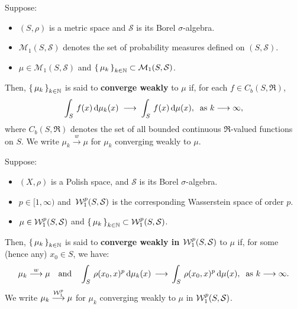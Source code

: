 \begin{definition}
\mbox{}\vskip 0.1cm
\noindent
Suppose:
\begin{itemize}
\item $\left(S,\rho\right)$ is a metric space and $\mathcal{S}$ is its Borel $\sigma$-algebra.
\item $\mathcal{M}_{1}\!\left(S,\mathcal{S}\right)$ denotes the set of probability measures defined on $\left(S,\mathcal{S}\right)$.
\item $\mu \in \mathcal{M}_{1}\!\left(S,\mathcal{S}\right)$ and
	$\left\{\,\mu_{k}\,\right\}_{k\in\mathbb{N}} \subset \mathcal{M}_{1}\!\left(S,\mathcal{S}\right)$.
\end{itemize}
Then, $\left\{\,\mu_{k}\,\right\}_{k\in\mathbb{N}}$ is said to
\textbf{converge weakly} to $\mu$ if, for each $f \in C_{b}(S,\Re)$,
\begin{equation*}
\int_{S}\,f(x)\,\textnormal{d}\mu_{k}(x) \;\longrightarrow\;\int_{S}\,f(x)\,\textnormal{d}\mu(x),
\;\;\textnormal{as $k \longrightarrow \infty$},
\end{equation*}
where $C_{b}(S,\Re)$ denotes the set of all bounded continuous $\Re$-valued functions on $S$.
We write $\mu_{k}\overset{w}{\longrightarrow}\mu$ for $\mu_{k}$ converging weakly to $\mu$.
\end{definition}

\begin{definition}
\label{definition:WassersteinConvergence}
\mbox{}\vskip 0.1cm
\noindent
Suppose:
\begin{itemize}
\item $(X, \rho)$ is a Polish space, and $\mathcal{S}$ is its Borel $\sigma$-algebra.
\item $p \in [1,\infty)$ and\,
	$\mathcal{W}^{p}_{1}\!\left(S,\mathcal{S}\right)$ is the corresponding Wasserstein space of order $p$.
\item $\mu \in \mathcal{W}^{p}_{1}\!\left(S,\mathcal{S}\right)$ and
	$\left\{\,\mu_{k}\,\right\}_{k\in\mathbb{N}} \subset \mathcal{W}^{p}_{1}\!\left(S,\mathcal{S}\right)$.
\end{itemize}
Then, $\left\{\,\mu_{k}\,\right\}_{k\in\mathbb{N}}$ is said to
\textbf{converge weakly in $\mathcal{W}^{p}_{1}\!\left(S,\mathcal{S}\right)$} to $\mu$
if, for some (hence any) $x_{0} \in S$, we have:
\begin{equation*}
\mu_{k} \overset{w}{\longrightarrow} \mu
\quad\textnormal{and}\quad
\int_{S}\, \rho(x_{0},x)^{p}\,\textnormal{d}\mu_{k}(x) \,\longrightarrow\,\int_{S}\, \rho(x_{0},x)^{p}\,\textnormal{d}\mu(x),
\;\;\textnormal{as $k \longrightarrow \infty$}.
\end{equation*}
We write $\mu_{k} \overset{\mathcal{W}^{p}_{1}}{\longrightarrow} \mu$
for $\mu_{k}$ converging weakly to $\mu$ in $\mathcal{W}^{p}_{1}\!\left(S,\mathcal{S}\right)$.
\end{definition}

